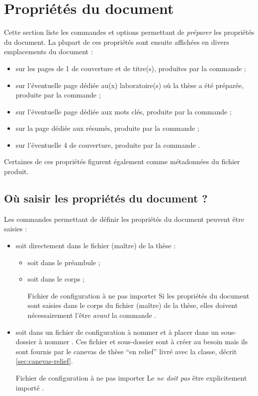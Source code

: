 \chapter{Propriétés du document}
\label{cha:propr-du-docum}

Cette section liste les commandes et options permettant de \emph{préparer} les
propriétés du document. La plupart de ces propriétés sont ensuite affichées en
divers emplacements du document :
\begin{itemize}
\item sur les pages de 1\iere{} de couverture et de titre(s), produites par la
  commande  ;
\item sur l'éventuelle page dédiée au(x) laboratoire(s) où la thèse a été préparée,
  produite par la commande  ;
\item sur l'éventuelle page dédiée aux mots clés, produite par la commande  ;
\item sur la page dédiée aux résumés, produite par la commande  ;
\item sur l'éventuelle 4\ieme{} de couverture, produite par la commande
  .
\end{itemize}
Certaines de ces propriétés figurent également comme métadonnées du fichier
\pdf produit.

\section{Où saisir les propriétés du document ?}
\label{sec:lieu-de-saisie}

Les commandes permettant de définir les propriétés du document peuvent être
saisies :
\begin{itemize}
\item soit directement dans le fichier (maître) de la thèse :
  \begin{itemize}
  \item soit dans le préambule ;
  \item soit dans le corps ;
  \begin{dbwarning}{Fichier de configuration à ne pas importer}{}
    Si les propriétés du document sont saisies dans le corps du fichier
    (maître) de la thèse, elles doivent nécessairement l'être \emph{avant} la
    commande .
  \end{dbwarning}
  \end{itemize}
\item soit dans un fichier de configuration à nommer \file{\configurationfile}
  et à placer dans un sous-dossier à nommer
  \directory{\configurationdirectory}. Ces fichier et sous-dossier  sont à créer au besoin mais ils sont fournis par
  le canevas de thèse \enquote{en relief} livré avec la classe, décrit
  \vref{sec:canevas-relief}.
  \begin{dbwarning}{Fichier de configuration à ne pas importer}{}
    Le \File{\configurationfile} \emph{ne doit pas} être explicitement importé
    .
  \end{dbwarning}
\end{itemize}

